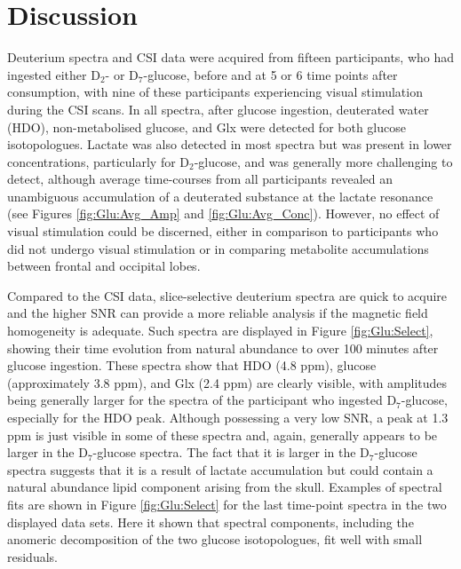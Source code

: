 \documentclass[class=article, crop=false]{standalone}
\begin{document}
\section{Discussion}

Deuterium spectra and CSI data were acquired from fifteen participants, who had ingested either D$_2$- or D$_7$-glucose, before and at 5 or 6 time points after consumption, with nine of these participants experiencing visual stimulation during the CSI scans. In all spectra, after glucose ingestion, deuterated water (HDO), non-metabolised glucose, and Glx were detected for both glucose isotopologues. Lactate was also detected in most spectra but was present in lower concentrations, particularly for D$_2$-glucose, and was generally more challenging to detect, although average time-courses from all participants revealed an unambiguous accumulation of a deuterated substance at the lactate resonance (see Figures \ref{fig:Glu:Avg_Amp} and \ref{fig:Glu:Avg_Conc}). However, no effect of visual stimulation could be discerned, either in comparison to participants who did not undergo visual stimulation or in comparing metabolite accumulations between frontal and occipital lobes.

 Compared to the CSI data, slice-selective deuterium spectra are quick to acquire and the higher SNR can provide a more reliable analysis if the magnetic field homogeneity is adequate. Such spectra are displayed in Figure \ref{fig:Glu:Select}, showing their time evolution from natural abundance to over 100 minutes after glucose ingestion. These spectra show that HDO (4.8 ppm), glucose (approximately 3.8 ppm), and Glx (2.4 ppm) are clearly visible, with amplitudes being generally larger for the spectra of the participant who ingested D$_7$-glucose, especially for the HDO peak. Although possessing a very low SNR, a peak at 1.3 ppm is just visible in some of these spectra and, again, generally appears to be larger in the D$_7$-glucose spectra. The fact that it is larger in the D$_7$-glucose spectra suggests that it is a result of lactate accumulation but could contain a natural abundance lipid component arising from the skull. Examples of spectral fits are shown in Figure \ref{fig:Glu:Select} for the last time-point spectra in the two displayed data sets. Here it shown that spectral components, including the anomeric decomposition of the two glucose isotopologues, fit well with small residuals.
\end{document}
